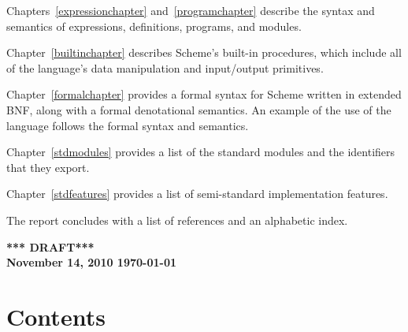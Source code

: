 \vest Chapters~\ref{expressionchapter} and~\ref{programchapter} describe
the syntax and semantics of expressions, definitions, programs, and modules.

\vest Chapter~\ref{builtinchapter} describes Scheme's built-in
procedures, which include all of the language's data manipulation and
input/output primitives.

\vest Chapter~\ref{formalchapter} provides a formal syntax for Scheme
written in extended BNF, along with a formal denotational semantics.
An example of the use of the language follows the formal syntax and
semantics.

\vest Chapter~\ref{stdmodules} provides a list of the standard modules
and the identifiers that they export.

\vest Chapter~\ref{stdfeatures} provides a list of semi-standard
implementation features.


\vest The report concludes with a list of references and an
alphabetic index.


\vfill
\begin{center}
{\large \bf
*** DRAFT*** \\
November 14, 2010
\today
}\end{center}

\vfill
\eject

\chapter*{Contents}
\addvspace{3.5pt}                  %
\renewcommand{\tocshrink}{-3.5pt}  %
{\footnotesize
\tableofcontents
}

\vfill
\eject
